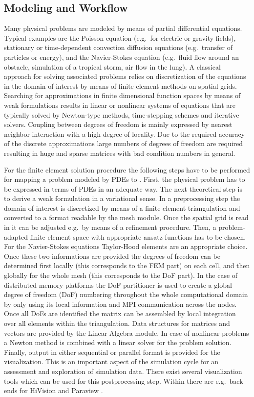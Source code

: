 \subsection{Modeling and Workflow}
Many physical problems are modeled by means of partial differential
equations.  Typical examples are the Poisson equation (e.g.~for
electric or gravity fields), stationary or time-dependent convection
diffusion equations (e.g.~transfer of particles or energy), and the
Navier-Stokes equation (e.g.~fluid flow around an obstacle, simulation
of a tropical storm, air flow in the lung). A classical approach for
solving associated problems relies on discretization of the equations
in the domain of interest by means of finite element methods
\cite{brezzi2008,braess2007,ciarlet2002} on spatial grids.  Searching
for approximations in finite dimensional function spaces by means of
weak formulations results in linear or nonlinear systems of equations
that are typically solved by Newton-type methods, time-stepping
schemes and iterative solvers. Coupling between degrees of freedom is
mainly expressed by nearest neighbor interaction with a high degree of
locality. Due to the required accuracy of the discrete approximations
large numbers of degrees of freedom are required resulting in huge and
sparse matrices with bad condition numbers in general.

For the finite element solution procedure the following steps have to
be performed for mapping a problem modeled by PDEs to \hiflow. First,
the physical problem has to be expressed in terms of PDEs in an
adequate way.  The next theoretical step is to derive a weak
formulation in a variational sense. In a preprocessing step the domain
of interest is discretized by means of a finite element triangulation
and converted to a format readable by the mesh module. Once the
spatial grid is read in it can be adjusted e.g.~by means of a
refinement procedure. Then, a problem-adapted finite element space
with appropriate ansatz functions has to be chosen. For the Navier-Stokes
equations Taylor-Hood elements are an appropriate choice. Once these two
informations are provided the degrees of freedom can be determined first locally
(this corresponds to the FEM part) on each cell, and then globally for the whole
mesh (this corresponds to the DoF part). In the case of distributed
memory platforms the DoF-partitioner is used to create a global degree of freedom (DoF) numbering
throughout the whole computational domain by only using its local information
and MPI communication across the nodes. Once all DoFs are identified the matrix
can be assembled by local integration over all elements within the
triangulation. Data structures for matrices and vectors are provided by the
Linear Algebra module. In case of nonlinear problems a Newton method is
combined with a linear solver for the problem solution. Finally, output in
either sequential or parallel format is provided for the visualization. 
This is an important aspect of the simulation cycle for an assessment and
exploration of simulation data. There exist several visualization tools which 
can be used for this postprocessing step. Within \hiflow{} there are
e.g.~back ends for HiVision \cite{HiVision} and Paraview \cite{Paraview}.


